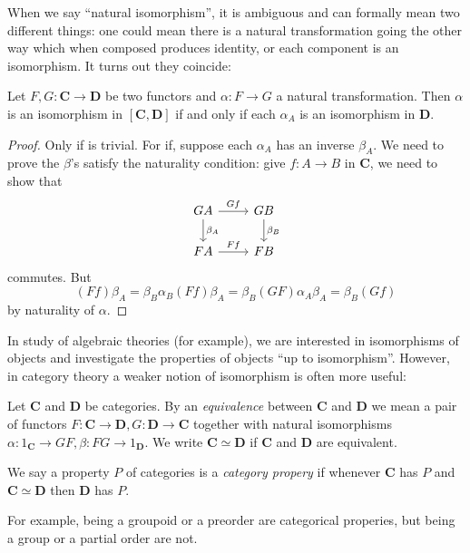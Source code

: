 \documentclass[a4paper]{article}
\renewcommand{\c}[1]{\mathbf{#1}}
\begin{document}
When we say ``natural isomorphism'', it is ambiguous and can formally mean two different things: one could mean there is a natural transformation going the other way which when composed produces identity, or each component is an isomorphism. It turns out they coincide:

\begin{lemma}
  Let \(F, G: \c C \to \c D\) be two functors and \(\alpha: F \to G\) a natural transformation. Then \(\alpha\) is an isomorphism in \([\c C, \c D]\) if and only if each \(\alpha_A\) is an isomorphism in \(\c D\).
\end{lemma}

\begin{proof}
  Only if is trivial. For if, suppose each \(\alpha_A\) has an inverse \(\beta_A\). We need to prove the \(\beta\)'s satisfy the naturality condition: give \(f: A \to B\) in \(\c C\), we need to show that
  \[
    \begin{tikzcd}
      GA \ar[r, "Gf"] \ar[d, "\beta_A"] & GB \ar[d, "\beta_B"] \\
      FA \ar[r, "Ff"] & FB
    \end{tikzcd}
  \]
  commutes. But
  \[
    (Ff) \beta_A = \beta_B \alpha_B(Ff) \beta_A
    = \beta_B (GF) \alpha_A \beta_A
    =\beta_B (Gf)
  \]
  by naturality of \(\alpha\).
\end{proof}

In study of algebraic theories (for example), we are interested in isomorphisms of objects and investigate the properties of objects ``up to isomorphism''. However, in category theory a weaker notion of isomorphism is often more useful:

\begin{definition}[equivalence]
  Let \(\c C\) and \(\c D\) be categories. By an \emph{equivalence} between \(\c C\) and \(\c D\) we mean a pair of functors \(F : \c C \to \c D, G: \c D \to \c C\) together with natural isomorphisms \(\alpha: 1_{\c C} \to GF, \beta: FG \to 1_{\c D}\). We write \(\c C \simeq \c D\) if \(\c C\) and \(\c D\) are equivalent.

  We say a property \(P\) of categories is a \emph{category propery} if whenever \(\c C\) has \(P\) and \(\c C \simeq \c D\) then \(\c D\) has \(P\).
\end{definition}

For example, being a groupoid or a preorder are categorical properies, but being a group or a partial order are not.
\end{document}
